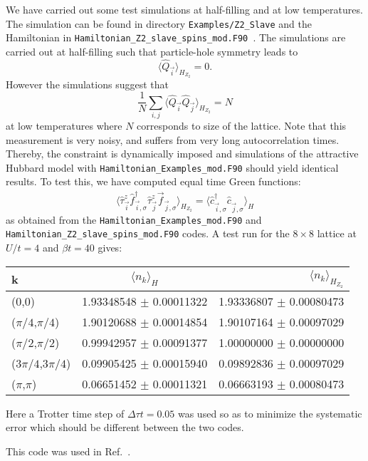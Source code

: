 We have carried out some test simulations at half-filling and at low temperatures.  The simulation can be found in directory \texttt{Examples/Z2\_Slave} and the  Hamiltonian in \texttt{Hamiltonian\_Z2\_slave\_spins\_mod.F90 }.  The simulations  are carried out at half-filling such that particle-hole symmetry leads to 
 \begin{equation}
 \langle \hat{Q}_{\vec{i}}    \rangle_{H_{Z_2}} =0.
 \end{equation} 
However the simulations suggest that 
 \begin{equation}
 \frac{1}{N}\sum_{i,j} \langle \hat{Q}_{\vec{i}}   \hat{Q}_{\vec{j}} \rangle_{H_{Z_2}}  = N 
 \end{equation} 
 at low temperatures  where  $N$  corresponds  to size of the lattice.  Note that this measurement is very noisy,  and suffers from very long autocorrelation times.  Thereby, the constraint is dynamically imposed and   simulations of the attractive Hubbard model with  \texttt{Hamiltonian\_Examples\_mod.F90}  should yield identical results. To test this,  we have computed equal time Green functions:
\begin{equation}
\langle  \hat{\tau}^{z}_{\vec{i}} \hat{f}^{\dagger}_{\vec{i},\sigma} \hat{\tau}^{z}_{\vec{j}} \vec{f}^{\phantom{\dagger}}_{\vec{j},\sigma} \rangle_{H_{Z_2}} = 
\langle  \hat{c}^{\dagger}_{\vec{i},\sigma} \hat{c}^{\phantom{\dagger}}_{\vec{j},\sigma} \rangle_{H} 
\end{equation}
as obtained  from  the \texttt{Hamiltonian\_Examples\_mod.F90} and    \texttt{Hamiltonian\_Z2\_slave\_spins\_mod.F90} codes.  
A test run for the $8\times 8 $ lattice at $U/t = 4$ and $\beta t = 40$ gives: 
\begin{center}
\begin{tabular}{ l | c | r }
 \hline			
   k   &  $\langle n_k \rangle_{H} $  &  $\langle n_k \rangle_{H_{Z_2}} $ \\
  \hline
   (0,0)                               & 1.93348548    $\pm$    0.00011322  & 1.93336807   $\pm$      0.00080473 \\
   ($\pi/4$,$\pi/4$)             & 1.90120688     $\pm$   0.00014854  & 1.90107164    $\pm$     0.00097029  \\
   ($\pi/2$,$\pi/2$)             & 0.99942957     $\pm$   0.00091377  & 1.00000000    $\pm$     0.00000000\\
   ($3\pi/4$,$3\pi/4$)         &  0.09905425     $\pm$   0.00015940 & 0.09892836    $\pm$     0.00097029 \\
   ($\pi$,$\pi$)                   & 0.06651452     $\pm$   0.00011321  & 0.06663193     $\pm$    0.00080473 \\
  \hline  
\end{tabular}

\end{center} 
\vspace*{0.5cm}
Here a Trotter time step of  $\Delta \tau t = 0.05$ was used  so as to minimize the systematic error   which should be different  between the two codes. 

This code  was used in Ref.~\cite{Hohenadler19}. 

\newpage
